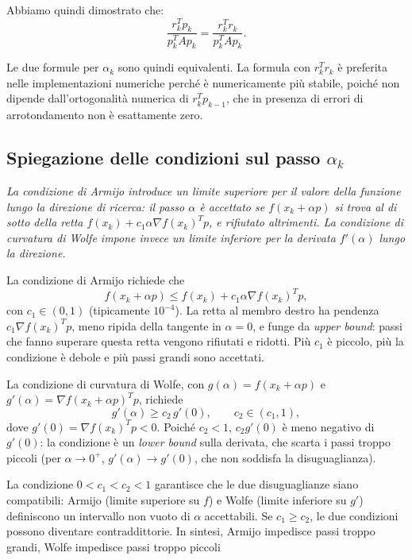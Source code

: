 \documentclass[a4paper,12pt]{article}
\numberwithin{equation}{section}
\numberwithin{figure}{section}
\numberwithin{table}{section}
\begin{document}
Abbiamo quindi dimostrato che:
\[
\frac{r_k^T p_k}{p_k^T A p_k} = \frac{r_k^T r_k}{p_k^T A p_k}.
\]

Le due formule per $\alpha_k$ sono quindi equivalenti. La formula con $r_k^T r_k$ è preferita nelle implementazioni numeriche perché è numericamente più stabile, poiché non dipende dall'ortogonalità numerica di $r_k^T p_{k-1}$, che in presenza di errori di arrotondamento non è esattamente zero.
\newpage
\subsection{Spiegazione delle condizioni sul passo $\alpha_k$}\label{app:wolfe}
\textit{
La condizione di Armijo introduce un limite superiore per il valore della funzione lungo la direzione di ricerca: il passo $\alpha$ è accettato se $f(x_k+\alpha p)$ si trova al di sotto della retta $f(x_k)+c_1\alpha\nabla f(x_k)^Tp$, e rifiutato altrimenti. La condizione di curvatura di Wolfe impone invece un limite inferiore per la derivata $f'(\alpha)$ lungo la direzione.
}

La condizione di Armijo richiede che
\[
f(x_k+\alpha p) \le f(x_k) + c_1 \alpha \nabla f(x_k)^T p,
\]
con $c_1 \in (0,1)$ (tipicamente $10^{-4}$). La retta al membro destro ha pendenza $c_1\nabla f(x_k)^Tp$, meno ripida della tangente in $\alpha=0$, e funge da \emph{upper bound}: passi che fanno superare questa retta vengono rifiutati e ridotti. Più $c_1$ è piccolo, più la condizione è debole e più passi grandi sono accettati.

La condizione di curvatura di Wolfe, con $g(\alpha)=f(x_k+\alpha p)$ e $g'(\alpha)=\nabla f(x_k+\alpha p)^Tp$, richiede
\[
g'(\alpha) \ge c_2 \, g'(0), \qquad c_2 \in (c_1,1),
\]
dove $g'(0)=\nabla f(x_k)^Tp<0$. Poiché $c_2<1$, $c_2g'(0)$ è meno negativo di $g'(0)$: la condizione è un \emph{lower bound} sulla derivata, che scarta i passi troppo piccoli (per $\alpha\to0^+$, $g'(\alpha)\to g'(0)$, che non soddisfa la disuguaglianza).

La condizione $0<c_1<c_2<1$ garantisce che le due disuguaglianze siano compatibili: Armijo (limite superiore su $f$) e Wolfe (limite inferiore su $g'$) definiscono un intervallo non vuoto di $\alpha$ accettabili. Se $c_1\ge c_2$, le due condizioni possono diventare contraddittorie. In sintesi, Armijo impedisce passi troppo grandi, Wolfe impedisce passi troppo piccoli
\end{document}
